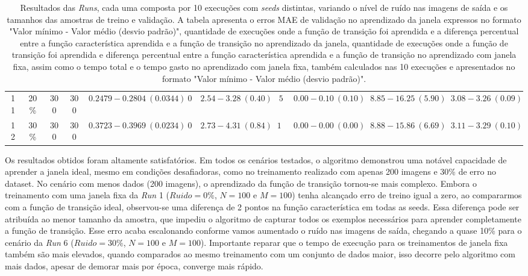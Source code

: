 \begin{table}[ht]
{\begin{tabular}{ccccccccccc}
            11 & 20\% & 300 & 300 & $0.2479 - 0.2804 \ (0.0344)$ & $0$ & $2.54 - 3.28 \ (0.40)$ &$5$ & $0.00 - 0.10 \ (0.10)$ & $8.85 - 16.25 \ (5.90)$ & $3.08 - 3.26 \ (0.09)$  \\
            12 & 30\% & 300 & 300 & $0.3723 - 0.3969 \ (0.0234)$ & $0$ & $2.73 - 4.31 \ (0.84)$ &$10$ & $0.00 - 0.00 \ (0.00)$ & $8.88 - 15.86 \ (6.69)$ & $3.11 - 3.29 \ (0.10)$ \\
            \bottomrule
        \end{tabular}
    }
    \caption[Resultados das \textit{Runs} \textbf{GoL}]{Resultados das \textit{Runs}, cada uma composta por 10 execuções com \textit{seeds} distintas, variando o nível de ruído nas imagens de saída e os tamanhos das amostras de treino e validação. A tabela apresenta o erros MAE de validação no aprendizado da janela expressos no formato "Valor mínimo - Valor médio (desvio padrão)", quantidade de execuções onde a função de transição foi aprendida e a diferença percentual entre a função característica aprendida e a função de transição no aprendizado da janela,  quantidade de execuções onde a função de transição foi aprendida e diferença percentual entre a função característica aprendida e a função de transição no aprendizado com janela fixa, assim como o tempo total e o tempo gasto no aprendizado com janela fixa, também calculados nas 10 execuções e apresentados no formato "Valor mínimo - Valor médio (desvio padrão)".}
    \label{tab:resultados_gol}
\end{table}





Os resultados obtidos foram altamente satisfatórios. Em todos os cenários testados, o algoritmo demonstrou uma notável capacidade de aprender a janela ideal, mesmo em condições desafiadoras, como no treinamento realizado com apenas 200 imagens e 30\% de erro no dataset. No cenário com menos dados (200 imagens), o aprendizado da função de transição tornou-se mais complexo. Embora o treinamento com uma janela fixa da \textit{Run} 1 ($Ruido = 0\%$, $N=100$ e $M=100$) tenha alcançado erro de treino igual a zero, ao compararmos com a função de transição ideal, observou-se uma diferença de 2 pontos na função característica em todas as seeds. Essa diferença pode ser atribuída ao menor tamanho da amostra, que impediu o algoritmo de capturar todos os exemplos necessários para aprender completamente a função de transição. Esse erro acaba escalonando conforme vamos aumentado o ruído nas imagens de saída, chegando a quase 10\% para o cenário da \textit{Run} 6 ($Ruido = 30\%$, $N=100$ e $M=100$). Importante reparar que o tempo de execução para os treinamentos de janela fixa também são mais elevados, quando comparados ao mesmo treinamento com um conjunto de dados maior, isso decorre pelo algoritmo com mais dados, apesar de demorar mais por época, converge mais rápido.

